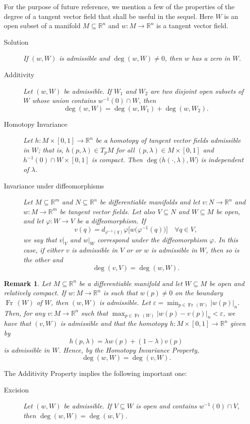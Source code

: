 \documentclass[a4paper]{amsart}
\numberwithin{equation}{section}
\newtheorem{remark}[theorem]{Remark}
\DeclareMathOperator{\Fr}{\mathrm{Fr}\,}
\newcommand{\R}{\mathbb{R}}
\newcommand{\e}{\varepsilon}
\begin{document}
For the purpose of future reference, we mention a few of the properties of the degree 
of a tangent vector field that shall be useful in the sequel. Here $W$ is an open subset 
of a manifold $M\subseteq\R^n$ and $w:M\to\R^n$ is a tangent vector field.
\begin{description}
\item[Solution]
{\em If $(w,W)$ is admissible and $\deg(w,W)\neq 0$, then $w$ has a zero in $W$.}
\item[Additivity]
{\em Let $(w,W)$ be admissible. If $W_1$ and $W_2$ are two
disjoint open subsets of $W$ whose union contains $w^{-1}(0)\cap W$, then}
\[
\deg(w,W) = \deg(w,W_1)+\deg(w,W_2).
\]
\item[Homotopy Invariance]
{\em Let $h:M\times[0,1]\to\R^n$ be a homotopy of tangent vector fields admissible in 
$W$; that is, $h(p,\lambda)\in T_pM$ for all $(p,\lambda)\in M\times[0,1]$ and 
$h^{-1}(0)\cap W\times[0,1]$ is compact. 
Then $\deg\big(h(\cdot,\lambda),W\big)$ is independent of $\lambda$.}
\item[Invariance under diffeomorphisms] {\em Let $M\subseteq\R^m$ and $N\subseteq\R^n$ 
be differentiable manifolds and let $v:N\to\R^n$ and $w:M\to\R^m$ be tangent vector fields.
Let also $V\subseteq N$ and $W\subseteq M$ be open, and let $\varphi:W\to V$ be a 
diffeomorphism. If 
\[
v(q)=d_{\varphi^{-1}(q)}\varphi\big[w\big(\varphi^{-1}(q)\big)\big]\quad
\forall q\in V,
\]
we say that $v|_V$ and $w|_W$ correspond under the diffeomorphism $\varphi$. In this case, 
if either $v$ is admissible in $V$ or or $w$ is admissible in $W$, then so is the other and 
\[
\deg(v,V)=\deg(w,W).
\]}
\end{description}
\begin{remark}\label{sper}
Let $M\subseteq\R^n$ be a differentiable manifold and let $W\subseteq M$ be open and 
relatively compact. If $w:M\to\R^n$ is such that $w(p)\neq 0$ on the boundary $\Fr(W)$ 
of $W$, then $(w,W)$ is admissible. Let $\e=\min_{p\in\Fr(W)}|w(p)|_n$. Then, for any 
$v:M\to\R^n$ such that $\max_{p\in\Fr(W)}|w(p)-v(p)|_n<\e$, we have that $(v,W)$ is 
admissible and that the homotopy $h:M\times[0,1]\to\R^n$ given by 
\[
h(p,\lambda)=\lambda w(p)+(1-\lambda) v(p)
\]
is admissible in $W$. Hence, by the Homotopy Invariance Property, 
\[
\deg(w,W)=\deg(v,W).
\]
\end{remark}

The Additivity Property implies the following important one:
\begin{description}
 \item[Excision]{\em Let $(w,W)$ be admissible. If $V\subseteq W$ is open and contains 
$w^{-1}(0)\cap V$, then $\deg(w,W) = \deg(w,V)$.} 
\end{description}
\end{document}
